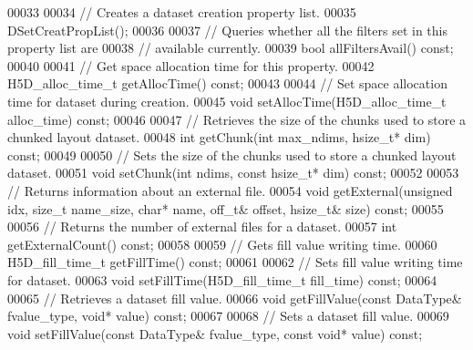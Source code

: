 \begin{DoxyCode}
00033 
00034         \textcolor{comment}{// Creates a dataset creation property list.}
00035         DSetCreatPropList();
00036 
00037         \textcolor{comment}{// Queries whether all the filters set in this property list are}
00038         \textcolor{comment}{// available currently.}
00039         \textcolor{keywordtype}{bool} allFiltersAvail() \textcolor{keyword}{const};
00040 
00041         \textcolor{comment}{// Get space allocation time for this property.}
00042         H5D\_alloc\_time\_t getAllocTime() \textcolor{keyword}{const};
00043 
00044         \textcolor{comment}{// Set space allocation time for dataset during creation.}
00045         \textcolor{keywordtype}{void} setAllocTime(H5D\_alloc\_time\_t alloc\_time) \textcolor{keyword}{const};
00046 
00047         \textcolor{comment}{// Retrieves the size of the chunks used to store a chunked layout dataset.}
00048         \textcolor{keywordtype}{int} getChunk(\textcolor{keywordtype}{int} max\_ndims, hsize\_t* dim) \textcolor{keyword}{const};
00049 
00050         \textcolor{comment}{// Sets the size of the chunks used to store a chunked layout dataset.}
00051         \textcolor{keywordtype}{void} setChunk(\textcolor{keywordtype}{int} ndims, \textcolor{keyword}{const} hsize\_t* dim) \textcolor{keyword}{const};
00052 
00053         \textcolor{comment}{// Returns information about an external file.}
00054         \textcolor{keywordtype}{void} getExternal(\textcolor{keywordtype}{unsigned} idx, \textcolor{keywordtype}{size\_t} name\_size, \textcolor{keywordtype}{char}* name, off\_t& offset, hsize\_t& size) \textcolor{keyword}{const};
00055 
00056         \textcolor{comment}{// Returns the number of external files for a dataset.}
00057         \textcolor{keywordtype}{int} getExternalCount() \textcolor{keyword}{const};
00058 
00059         \textcolor{comment}{// Gets fill value writing time.}
00060         H5D\_fill\_time\_t getFillTime() \textcolor{keyword}{const};
00061 
00062         \textcolor{comment}{// Sets fill value writing time for dataset.}
00063         \textcolor{keywordtype}{void} setFillTime(H5D\_fill\_time\_t fill\_time) \textcolor{keyword}{const};
00064 
00065         \textcolor{comment}{// Retrieves a dataset fill value.}
00066         \textcolor{keywordtype}{void} getFillValue(\textcolor{keyword}{const} DataType& fvalue\_type, \textcolor{keywordtype}{void}* value) \textcolor{keyword}{const};
00067 
00068         \textcolor{comment}{// Sets a dataset fill value.}
00069         \textcolor{keywordtype}{void} setFillValue(\textcolor{keyword}{const} DataType& fvalue\_type, \textcolor{keyword}{const} \textcolor{keywordtype}{void}* value) \textcolor{keyword}{const};

\end{DoxyCode}
